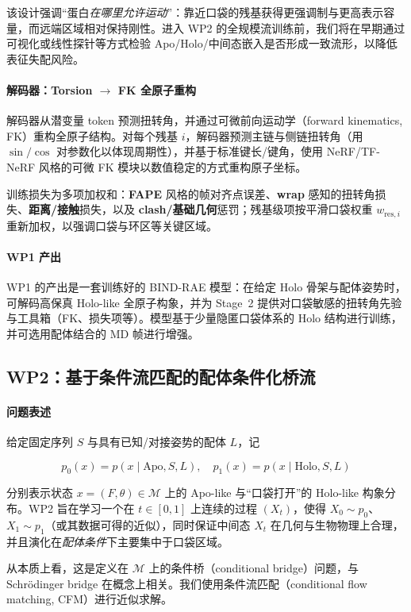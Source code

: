 \documentclass[11pt,a4paper,fontset=fandol]{ctexart}
\begin{document}
该设计强调“蛋白\emph{在哪里允许运动}”：靠近口袋的残基获得更强调制与更高表示容量，而远端区域相对保持刚性。进入 WP2 的全规模流训练前，我们将在早期通过可视化或线性探针等方式检验 Apo/Holo/中间态嵌入是否形成一致流形，以降低表征失配风险。

\paragraph{解码器：Torsion $\to$ FK 全原子重构}
解码器从潜变量 token 预测扭转角，并通过可微前向运动学（forward kinematics, FK）重构全原子结构。对每个残基 $i$，解码器预测主链与侧链扭转角（用 $\sin/\cos$ 对参数化以体现周期性），并基于标准键长/键角，使用 NeRF/TF-NeRF 风格的可微 FK 模块以数值稳定的方式重构原子坐标。

训练损失为多项加权和：\textbf{FAPE} 风格的帧对齐点误差、\textbf{wrap} 感知的扭转角损失、\textbf{距离/接触}损失，以及 \textbf{clash/基础几何}惩罚；残基级项按平滑口袋权重 $w_{\text{res},i}$ 重新加权，以强调口袋与环区等关键区域。

\paragraph{WP1 产出}
WP1 的产出是一套训练好的 BIND-RAE 模型：在给定 Holo 骨架与配体姿势时，可解码高保真 Holo-like 全原子构象，并为 Stage~2 提供对口袋敏感的扭转角先验与工具箱（FK、损失项等）。模型基于少量隐匿口袋体系的 Holo 结构进行训练，并可选用配体结合的 MD 帧进行增强。

\subsection{WP2：基于条件流匹配的配体条件化桥流}

\paragraph{问题表述}
给定固定序列 $S$ 与具有已知/对接姿势的配体 $L$，记

\[
p_0(x) = p(x \mid \mathrm{Apo}, S, L), \quad
p_1(x) = p(x \mid \mathrm{Holo}, S, L)
\]

分别表示状态 $x = (F, \theta) \in \mathcal{M}$ 上的 Apo-like 与“口袋打开”的 Holo-like 构象分布。WP2 旨在学习一个在 $t\in[0,1]$ 上连续的过程 $(X_t)$，使得 $X_0 \sim p_0$、$X_1 \sim p_1$（或其数据可得的近似），同时保证中间态 $X_t$ 在几何与生物物理上合理，并且演化在\emph{配体条件}下主要集中于口袋区域。

从本质上看，这是定义在 $\mathcal{M}$ 上的条件桥（conditional bridge）问题，与 Schrödinger bridge 在概念上相关。我们使用条件流匹配（conditional flow matching, CFM）进行近似求解。
\end{document}
